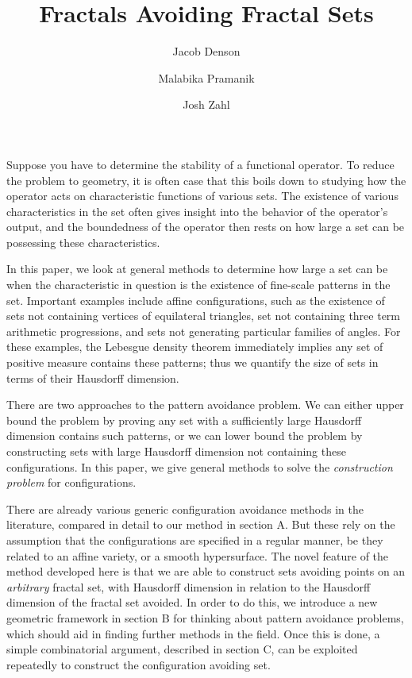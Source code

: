 \documentclass{article}
\title{Fractals Avoiding Fractal Sets}
\author{Jacob Denson\\ \and Malabika Pramanik\\ \and Josh Zahl}
\theoremstyle{plain}
\theoremstyle{plain}
\begin{document}
\maketitle

\begin{multicols}{2}

\begin{abstract}
	\blindtext[1]
\end{abstract}

Suppose you have to determine the stability of a functional operator. To reduce the problem to geometry, it is often case that this boils down to studying how the operator acts on characteristic functions of various sets. The existence of various characteristics in the set often gives insight into the behavior of the operator's output, and the boundedness of the operator then rests on how large a set can be possessing these characteristics.

In this paper, we look at general methods to determine how large a set can be when the characteristic in question is the existence of fine-scale patterns in the set. Important examples include affine configurations, such as the existence of sets not containing vertices of equilateral triangles, set not containing three term arithmetic progressions, and sets not generating particular families of angles. For these examples, the Lebesgue density theorem immediately implies any set of positive measure contains these patterns; thus we quantify the size of sets in terms of their Hausdorff dimension.

There are two approaches to the pattern avoidance problem. We can either upper bound the problem by proving any set with a sufficiently large Hausdorff dimension contains such patterns, or we can lower bound the problem by constructing sets with large Hausdorff dimension not containing these configurations. In this paper, we give general methods to solve the {\it construction problem} for configurations. 

There are already various generic configuration avoidance methods in the literature, compared in detail to our method in section A. But these rely on the assumption that the configurations are specified in a regular manner, be they related to an affine variety, or a smooth hypersurface. The novel feature of the method developed here is that we are able to construct sets avoiding points on an {\it arbitrary} fractal set, with Hausdorff dimension in relation to the Hausdorff dimension of the fractal set avoided. In order to do this, we introduce a new geometric framework in section B for thinking about pattern avoidance problems, which should aid in finding further methods in the field. Once this is done, a simple combinatorial argument, described in section C, can be exploited repeatedly to construct the configuration avoiding set.


\end{multicols}
\end{document}
